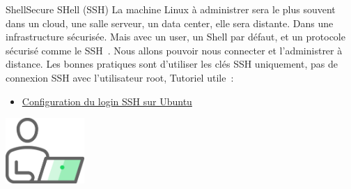 \documentclass{beamer}
\begin{document}
    \begin{frame}{Shell}{Secure SHell (SSH)}
        La machine Linux à administrer sera le plus souvent dans un cloud, une salle serveur, un data center, elle sera distante.
        Dans une infrastructure sécurisée.
        \bigbreak
        Mais avec un user, un Shell par défaut, et un protocole sécurisé comme le SSH~.
        Nous allons pouvoir nous connecter et l'administrer à distance.
        \bigbreak
        Les bonnes pratiques sont d'utiliser les clés SSH uniquement, pas de connexion SSH avec l'utilisateur root,
        Tutoriel utile~:
        \begin{itemize}
            \item \href{https://phoenixnap.com/kb/generate-setup-ssh-key-ubuntu}{Configuration du login SSH sur Ubuntu}
        \end{itemize}
        \bigbreak
        \centering
        \includegraphics[width=3cm]{image/guy-in-front-of-desktop}
    \end{frame}
\end{document}
